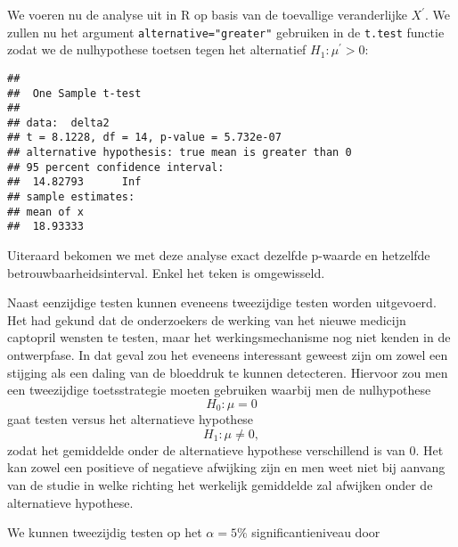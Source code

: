 \documentclass[12pt,dutch,coursenotes]{book}
\newenvironment{Shaded}{\begin{snugshade}}{\end{snugshade}}
\newcommand{\KeywordTok}[1]{\textcolor[rgb]{0.13,0.29,0.53}{\textbf{#1}}}
\newcommand{\DataTypeTok}[1]{\textcolor[rgb]{0.13,0.29,0.53}{#1}}
\newcommand{\StringTok}[1]{\textcolor[rgb]{0.31,0.60,0.02}{#1}}
\newcommand{\OperatorTok}[1]{\textcolor[rgb]{0.81,0.36,0.00}{\textbf{#1}}}
\newcommand{\NormalTok}[1]{#1}
\theoremstyle{definition}
\theoremstyle{definition}
\theoremstyle{definition}
\theoremstyle{remark}
\begin{document}
We voeren nu de analyse uit in R op basis van de toevallige
veranderlijke \(X^\prime\). We zullen nu het argument
\texttt{alternative="greater"} gebruiken in de \texttt{t.test} functie
zodat we de nulhypothese toetsen tegen het alternatief
\(H_1: \mu^\prime>0\):

\begin{Shaded}
\end{Shaded}

\begin{verbatim}
## 
##  One Sample t-test
## 
## data:  delta2
## t = 8.1228, df = 14, p-value = 5.732e-07
## alternative hypothesis: true mean is greater than 0
## 95 percent confidence interval:
##  14.82793      Inf
## sample estimates:
## mean of x 
##  18.93333
\end{verbatim}

Uiteraard bekomen we met deze analyse exact dezelfde p-waarde en
hetzelfde betrouwbaarheidsinterval. Enkel het teken is omgewisseld.

Naast eenzijdige testen kunnen eveneens tweezijdige testen worden
uitgevoerd. Het had gekund dat de onderzoekers de werking van het nieuwe
medicijn captopril wensten te testen, maar het werkingsmechanisme nog
niet kenden in de ontwerpfase. In dat geval zou het eveneens interessant
geweest zijn om zowel een stijging als een daling van de bloeddruk te
kunnen detecteren. Hiervoor zou men een tweezijdige toetsstrategie
moeten gebruiken waarbij men de nulhypothese \[H_0: \mu=0\] gaat testen
versus het alternatieve hypothese \[H_1: \mu\neq0,\] zodat het
gemiddelde onder de alternatieve hypothese verschillend is van 0. Het
kan zowel een positieve of negatieve afwijking zijn en men weet niet bij
aanvang van de studie in welke richting het werkelijk gemiddelde zal
afwijken onder de alternatieve hypothese.

We kunnen tweezijdig testen op het \(\alpha=5\%\) significantieniveau
door
\end{document}
